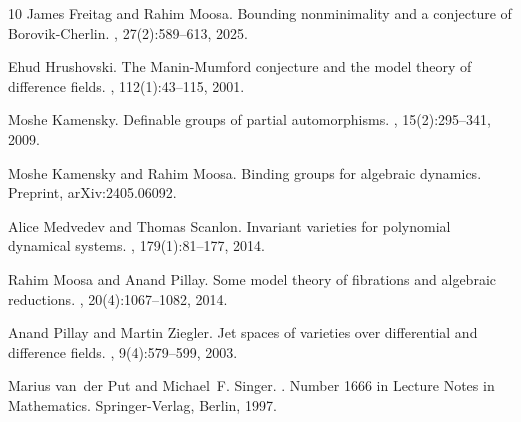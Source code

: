 \documentclass[\DocOpts]{amsart}
\theoremstyle{definition}
\newcommand{\<}{\langle}
\renewcommand{\>}{\rangle}
\begin{document}
\begin{thebibliography}{10}
James Freitag and Rahim Moosa.
\newblock Bounding nonminimality and a conjecture of {B}orovik-{C}herlin.
, 27(2):589--613, 2025.

Ehud Hrushovski.
\newblock The {M}anin-{M}umford conjecture and the model theory of difference
  fields.
, 112(1):43--115, 2001.

Moshe Kamensky.
\newblock Definable groups of partial automorphisms.
, 15(2):295--341, 2009.

Moshe Kamensky and Rahim Moosa.
\newblock Binding groups for algebraic dynamics.
\newblock Preprint, arXiv:2405.06092.

Alice Medvedev and Thomas Scanlon.
\newblock Invariant varieties for polynomial dynamical systems.
, 179(1):81--177, 2014.

Rahim Moosa and Anand Pillay.
\newblock Some model theory of fibrations and algebraic reductions.
, 20(4):1067--1082, 2014.

Anand Pillay and Martin Ziegler.
\newblock Jet spaces of varieties over differential and difference fields.
, 9(4):579--599, 2003.

Marius van~der Put and Michael~F. Singer.
.
\newblock Number 1666 in Lecture Notes in Mathematics. Springer-Verlag, Berlin,
  1997.

\end{thebibliography}

%
\end{document}

